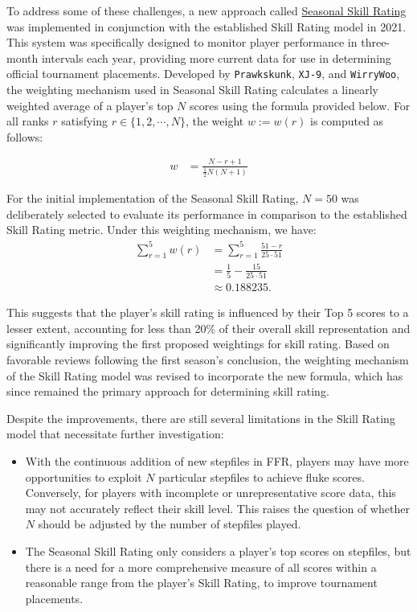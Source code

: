 \vspace{2mm}

To address some of these challenges, a new approach called \href{https://www.flashflashrevolution.com/ffr/season-1/}{Seasonal Skill Rating} was implemented in conjunction with the established Skill Rating model in 2021. This system was specifically designed to monitor player performance in three-month intervals each year, providing more current data for use in determining official tournament placements. Developed by \texttt{Prawkskunk}, \texttt{XJ-9}, and \texttt{WirryWoo}, the weighting mechanism used in Seasonal Skill Rating calculates a linearly weighted average of a player's top $N$ scores using the formula provided below. For all ranks $r$ satisfying $r \in \{1, 2, \cdots, N\}$, the weight $w := w(r)$ is computed as follows:

\begin{align*}
	w & = \frac{N - r + 1}{\frac{1}{2}N (N + 1)} 
\end{align*}


For the initial implementation of the Seasonal Skill Rating, $N = 50$ was deliberately selected to evaluate its performance in comparison to the established Skill Rating metric. Under this weighting mechanism, we have:
\begin{align*}
	\sum_{r = 1}^5 w(r) & = \displaystyle \sum_{r = 1}^5 \frac{51 - r}{25 \cdot 51} \\
  &= \frac{1}{5} - \frac{15}{25 \cdot 51}\\
  &\approx 0.188235.
\end{align*}

This suggests that the player's skill rating is influenced by their Top 5 scores to a lesser extent, accounting for less than 20\% of their overall skill representation and significantly improving the first proposed weightings for skill rating. Based on favorable reviews following the first season's conclusion, the weighting mechanism of the Skill Rating model was revised to incorporate the new formula, which has since remained the primary approach for determining skill rating.
\vspace{2mm}

Despite the improvements, there are still several limitations in the Skill Rating model that necessitate further investigation: 
\begin{itemize}
	\item With the continuous addition of new stepfiles in FFR, players may have more opportunities to exploit $N$ particular stepfiles to achieve fluke scores. Conversely, for players with incomplete or unrepresentative score data, this may not accurately reflect their skill level. This raises the question of whether $N$ should be adjusted by the number of stepfiles played.
	\item The Seasonal Skill Rating only considers a player's top scores on stepfiles, but there is a need for a more comprehensive measure of all scores within a reasonable range from the player's Skill Rating, to improve tournament placements.
	      
\end{itemize}

